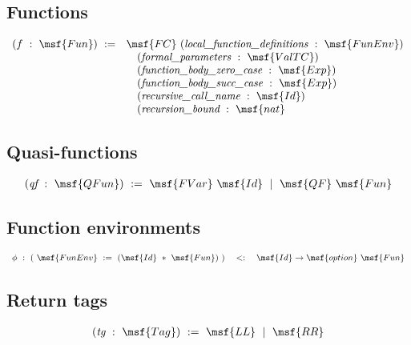 \documentclass{article}
\begin{document}
\subsection{Functions}

\begin{gather}
\begin{array}{lll}  
  (f \ : \ \msf{Fun}) \ := & \msf{FC} \
  (\mbox{\it local\_function\_definitions} \ : \ \msf{FunEnv}) \\
  & \quad (\mbox{\it formal\_parameters} \ : \ \msf{ValTC}) \\
  & \quad (\mbox{\it function\_body\_zero\_case} \ : \ \msf{Exp}) \\
  & \quad (\mbox{\it function\_body\_succ\_case} \ : \ \msf{Exp}) \\
  & \quad (\mbox{\it recursive\_call\_name} \ : \ \msf{Id}) \\
  & \quad (\mbox{\it recursion\_bound} \ : \ \msf{nat}
\end{array}  
\end{gather}


\subsection{Quasi-functions}

\begin{gather}
  (\mbox{\it qf} \ : \ \msf{QFun}) \ := \
  \msf{FVar} \ \msf{Id} \ \mid \ \msf{QF}
  \ \msf{Fun}
\end{gather}


\subsection{Function environments}

\begin{gather}
\begin{array}{lll}  
  \phi \ : \ ( \ \msf{FunEnv} \ := \ ( \msf{Id} \ * \ \msf{Fun}) \ )
   \quad <: \quad  \msf{Id} \to \msf{option} \ \msf{Fun}
\end{array}
\end{gather}  


\subsection{Return tags}

\begin{gather}
  (\mbox{\it tg} \ : \ \msf{Tag}) \ := \ \msf{LL} \ \mid \ \msf{RR} 
\end{gather}
\end{document}
